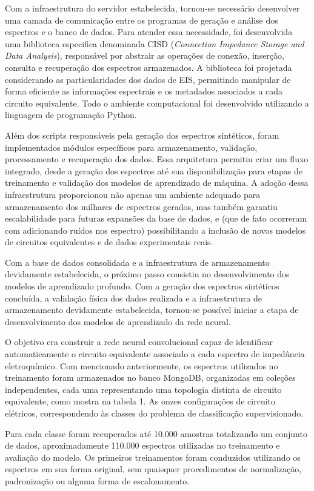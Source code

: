 Com a infraestrutura do
servidor estabelecida, tornou-se necessário desenvolver uma camada de comunicação entre os
programas de geração e análise dos espectros e o banco de dados. Para atender essa necessidade,
foi desenvolvida uma biblioteca especifica denominada CISD (\textit{Connection Impedance Storage
and Data Analysis}), responsável por abstrair as operações de conexão, inserção, consulta e
recuperação dos espectros armazenados. A biblioteca foi projetada considerando as
particularidades dos dados de EIS, permitindo manipular de forma eficiente as informações
espectrais e os metadados associados a cada circuito equivalente. Todo o ambiente
computacional foi desenvolvido utilizando a linguagem de programação Python. 

Além dos
scripts responsáveis pela geração dos espectros sintéticos, foram implementados módulos
específicos para armazenamento, validação, processamento e recuperação dos dados. Essa
arquitetura permitiu criar um fluxo integrado, desde a geração dos espectros até sua
disponibilização para etapas de treinamento e validação dos modelos de aprendizado de
máquina. A adoção dessa infraestrutura proporcionou não apenas um ambiente adequado para
armazenamento dos milhares de espectros gerados, mas também garantiu escalabilidade para
futuras expansões da base de dados, e (que de fato ocorreram com adicionando ruídos nos
espectro) possibilitando a inclusão de novos modelos de circuitos equivalentes e de dados
experimentais reais. 

Com a base de dados consolidada e a infraestrutura de armazenamento
devidamente estabelecida, o próximo passo consistiu no desenvolvimento dos modelos de
aprendizado profundo. Com a geração dos espectros sintéticos concluída, a validação física
dos dados realizada e a infraestrutura de armazenamento devidamente estabelecida, tornou-se
possível iniciar a etapa de desenvolvimento dos modelos de aprendizado da rede neural. 

O objetivo era construir a rede neural convolucional capaz de identificar automaticamente o circuito equivalente associado a cada espectro de impedância eletroquímico. Com mencionado
anteriormente, os espectros utilizados no treinamento foram armazenados no banco MongoDB,
organizadas em coleções independentes, cada uma representando uma topologia distinta de
circuito equivalente, como mostra na tabela 1. As onzes configurações de circuito elétricos,
correspondendo às classes do problema de classificação supervisionado. 

Para cada classe foram
recuperados até 10.000 amostras totalizando um conjunto de dados, aproximadamente 110.000
espectros utilizadas no treinamento e avaliação do modelo. Os primeiros treinamentos foram
conduzidos utilizando os espectros em sua forma original, sem quaisquer procedimentos de
normalização, padronização ou alguma forma de escalonamento.

